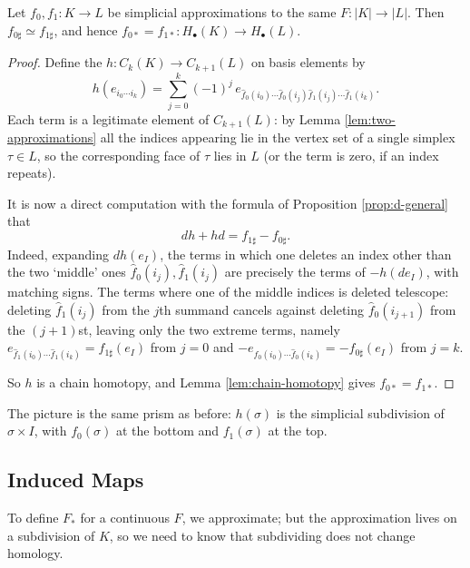 \documentclass[a4paper]{scrartcl}
\begin{document}
\begin{theorem} \label{thm:approx-chain-homotopic}
	Let $f_0, f_1: K \to L$ be simplicial approximations to the same $F: |K|\to|L|$. Then $f_{0\sharp}\simeq f_{1\sharp}$, and hence $f_{0*} = f_{1*}: H_\bullet(K)\to H_\bullet(L)$.
\end{theorem}
\begin{proof}
	Define the  $h: C_k(K)\to C_{k+1}(L)$ on basis elements by
	$$
	h(e_{i_0\cdots i_k}) = \sum_{j=0}^k (-1)^j\, e_{\hat f_0(i_0)\cdots \hat f_0(i_j)\hat f_1(i_j)\cdots \hat f_1(i_k)} .
	$$
	Each term is a legitimate element of $C_{k+1}(L)$: by Lemma \ref{lem:two-approximations} all the indices appearing lie in the vertex set of a single simplex $\tau\in L$, so the corresponding face of $\tau$ lies in $L$ (or the term is zero, if an index repeats).

	It is now a direct computation with the formula of Proposition \ref{prop:d-general} that
	$$
	dh + hd = f_{1\sharp}-f_{0\sharp}.
	$$
	Indeed, expanding $d h(e_I)$, the terms in which one deletes an index other than the two `middle' ones $\hat f_0(i_j), \hat f_1(i_j)$ are precisely the terms of $-h(d e_I)$, with matching signs. The terms where one of the middle indices is deleted telescope: deleting $\hat f_1(i_j)$ from the $j$th summand cancels against deleting $\hat f_0(i_{j+1})$ from the $(j+1)$st, leaving only the two extreme terms, namely $e_{\hat f_1(i_0)\cdots \hat f_1(i_k)} = f_{1\sharp}(e_I)$ from $j=0$ and $-e_{\hat f_0(i_0)\cdots\hat f_0(i_k)} = -f_{0\sharp}(e_I)$ from $j = k$.

	So $h$ is a chain homotopy, and Lemma \ref{lem:chain-homotopy} gives $f_{0*} = f_{1*}$.
\end{proof}

The picture is the same prism as before: $h(\sigma)$ is the simplicial subdivision of
$\sigma\times I$, with $f_0(\sigma)$ at the bottom and $f_1(\sigma)$ at the top.

\subsection{Induced Maps}

To define $F_*$ for a continuous $F$, we approximate; but the approximation lives on a
subdivision of $K$, so we need to know that subdividing does not change homology.
\end{document}
